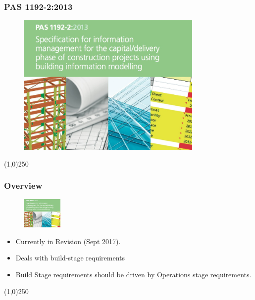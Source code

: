 \begin{frame}
\frametitle{PAS 1192-2:2013}
\begin{figure}
	\centering
	\includegraphics[width=9cm]{./images/Pas1192P2Image.jpg}
	\caption[]{}
	\label{fig:}
\end{figure}
\end{frame}
\begin{center}\line(1,0){250}\end{center}


\begin{frame}
\frametitle{Overview}
\begin{figure}
	\centering
	\includegraphics[height=1.5cm]{./images/Pas1192P2Image.jpg}
\end{figure}
\begin{itemize}
	\item Currently in Revision (Sept 2017).
	\item Deals with build-stage requirements
	\item Build Stage requirements should be driven by Operations stage requirements. 
\end{itemize}
\end{frame}
\begin{center}\line(1,0){250}\end{center}


